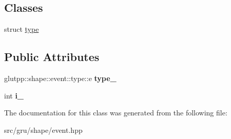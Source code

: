 \subsection*{\-Classes}
\begin{DoxyCompactItemize}
\item 
struct \hyperlink{structglutpp_1_1shape_1_1event_1_1type}{type}
\end{DoxyCompactItemize}
\subsection*{\-Public \-Attributes}
\begin{DoxyCompactItemize}
\item 
\hypertarget{classglutpp_1_1shape_1_1event_af0ccc0ef2ab93db722964bfd8012a9eb}{glutpp\-::shape\-::event\-::type\-::e {\bfseries type\-\_\-}}\label{classglutpp_1_1shape_1_1event_af0ccc0ef2ab93db722964bfd8012a9eb}

\item 
\hypertarget{classglutpp_1_1shape_1_1event_aedc6bd32e33dddd86846241d91f50f8a}{int {\bfseries i\-\_\-}}\label{classglutpp_1_1shape_1_1event_aedc6bd32e33dddd86846241d91f50f8a}

\end{DoxyCompactItemize}


\-The documentation for this class was generated from the following file\-:\begin{DoxyCompactItemize}
\item 
src/gru/shape/event.\-hpp\end{DoxyCompactItemize}
